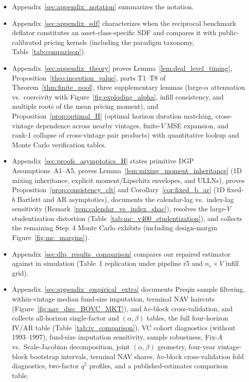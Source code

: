 \begin{itemize}
  \item Appendix~\ref{sec:appendix_notation} summarizes the notation.
  \item Appendix~\ref{sec:appendix_sdf} characterizes when the reciprocal benchmark deflator constitutes an asset-class-specific SDF and compares it with public-calibrated pricing kernels (including the paradigm taxonomy, Table~\ref{tab:comparison}).
  \item Appendix~\ref{sec:appendix_theory} proves Lemma~\ref{lem:deal_level_timing}, Proposition~\ref{theo:inception_value}, parts T1--T8 of Theorem~\ref{thm:finite_pool}, three supplementary lemmas (large-$\alpha$ attenuation vs.\ coercivity with Figure~\ref{fig:exploding_alpha}, infill consistency, and multiple roots of the mean pricing moment), and Proposition~\ref{prop:optimal_H} (optimal horizon duration matching, cross-vintage dependence across nearby vintages, finite-$V$ MSE expansion, and rank-1 collapse of cross-vintage pair products) with quantitative lookup and Monte Carlo verification tables.
  \item Appendix~\ref{sec:proofs_asymptotics_H} states primitive DGP Assumptions~A1--A5, proves Lemma~\ref{lem:mixing_moment_inheritance} (1D mixing inheritance, explicit moment/Lipschitz envelopes, and ULLNs), proves Proposition~\ref{prop:consistency_clt} and Corollary~\ref{cor:fixed_b_ar} (1D fixed-$b$ Bartlett and AR asymptotics), documents the calendar-lag vs.\ index-lag sensitivity (Remark~\ref{rem:calendar_vs_index_shac}), resolves the large-$V$ studentization distortion (Table~\ref{tab:mc_v400_studentization}), and collects the remaining Step~4 Monte Carlo exhibits (including design-margin Figure~\ref{fig:mc_margins}).
  \item Appendix~\ref{sec:dlp_results_comparison} compares our repaired estimator against \citet{DLP12} in simulation (Table~1 replication under pipeline r5 and $n_v \times V$ infill grid).
  \item Appendix~\ref{sec:appendix_empirical_extra} documents Preqin sample filtering, within-vintage median fund-size imputation, terminal NAV haircuts (Figure~\ref{fig:nav_disc_BOVC_MKT}), and $hv$-block cross-validation, and collects all-horizon single-factor and $(\alpha,\beta)$ tables, the full four-horizon IV/AR table (Table~\ref{tab:iv_comparison}), VC cohort diagnostics (without 1993--1997), fund-size imputation sensitivity, sample robustness, Fix-$A$ vs.\ Scale-Jacobian decomposition, joint $(\alpha,\beta)$ geometry, four-year vintage-block bootstrap intervals, terminal NAV shares, $hv$-block cross-validation fold diagnostics, two-factor $q^5$ profiles, and a published-estimates comparison table.
\end{itemize}

